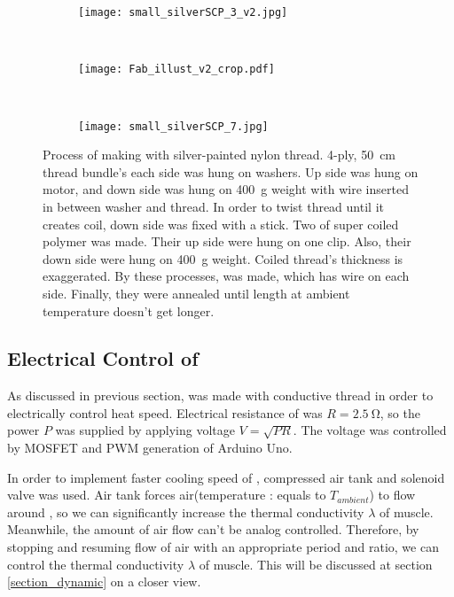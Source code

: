 \begin{figure}
	\centering
	\begin{subfigure}{.15\linewidth}
		\centering\texttt{[image: small\_silverSCP\_3\_v2.jpg]}
		\caption{\label{silverSCP_2}}
	\end{subfigure}
	~
	\begin{subfigure}{.45\linewidth}
		\centering\texttt{[image: Fab\_illust\_v2\_crop.pdf]}
		\caption{\label{silverSCP_illust}}
	\end{subfigure}
	~
	\begin{subfigure}{.15\linewidth}
		\centering\texttt{[image: small\_silverSCP\_7.jpg]}
		\caption{\label{silverSCP_annealing}}
	\end{subfigure}
	\caption[Process of making \scp with silver-painted nylon thread]{Process of making \scp with silver-painted nylon thread.   4-ply, \SI{50}{\centi\meter} thread bundle's each side was hung on washers. Up side was hung on motor, and down side was hung on \SI{400}{\gram} weight with wire inserted in between washer and thread.  In order to twist thread until it creates coil, down side was fixed with a stick. Two of super coiled polymer was made. Their up side were hung on one clip. Also, their down side were hung on \SI{400}{\gram} weight. Coiled thread's thickness is exaggerated.  By these processes, \scp was made, which has wire on each side. Finally, they were annealed until length at ambient temperature doesn't get longer.}
	\label{silverSCP_makingof}
\end{figure}

\subsection{Electrical Control of \SCP}\label{section_electrical_control}
As discussed in previous section, \scp was made with conductive thread in order to electrically control heat speed. Electrical resistance of \scp was $R=\SI{2.5}{\ohm}$, so the power $P$ was supplied by applying voltage $V=\sqrt{PR}$. The voltage was controlled by MOSFET and PWM generation of Arduino Uno.

In order to implement faster cooling speed of \scp, compressed air tank and solenoid valve was used. Air tank forces air(temperature : equals to  $T_{ambient}$) to flow around \scp, so we can significantly increase the thermal conductivity $\lambda$ of muscle. Meanwhile, the amount of air flow can't be analog controlled. Therefore, by stopping and resuming flow of air with an appropriate period and ratio, we can control the thermal conductivity $\lambda$ of muscle. This will be discussed at section \ref{section_dynamic} on a closer view.

